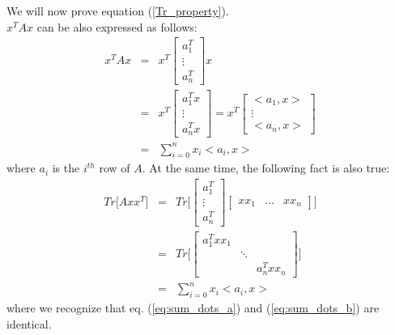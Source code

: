 \documentclass{article}
\begin{document}
We will now prove equation (\ref{Tr_property}).
\\
$x^T A x$ can be also expressed as follows:
\begin{eqnarray}
x^T A x &=& x^T \begin{bmatrix} 
a_1^T \\
\vdots \\ 
a_n^T
\end{bmatrix} x \\
&=&
x^T \begin{bmatrix} 
a_1^T x \\
\vdots \\ 
a_n^T x
\end{bmatrix} = x^T \begin{bmatrix} 
<a_1, x> \\
\vdots \\ 
<a_n, x>
\end{bmatrix} \\
&=&
\sum_{i = 0}^n x_i <a_i, x>
\label{eq:sum_dots_a}
\end{eqnarray}
where $a_i$ is the $i^{th}$ row of $A$.
At the same time, the following fact is also true:
\begin{eqnarray}
Tr \bigg [ A x x^T \bigg ] &=& 
Tr \bigg [
\begin{bmatrix} a_1^T \\ \vdots \\ a_n^T \end{bmatrix}
\begin{bmatrix} xx_1 & \hdots & xx_n \end{bmatrix}
\bigg ]  \\
&=&
Tr \bigg [
\begin{bmatrix} 
a_1^T xx_1 & & \\
& \ddots & \\
& & a_n^T xx_n
\end{bmatrix}
\bigg ] \\
&=&
\sum_{i = 0}^n x_i <a_i, x>
\label{eq:sum_dots_b}
\end{eqnarray}
where we recognize that eq. (\ref{eq:sum_dots_a}) and (\ref{eq:sum_dots_b}) are identical.
\end{document}
